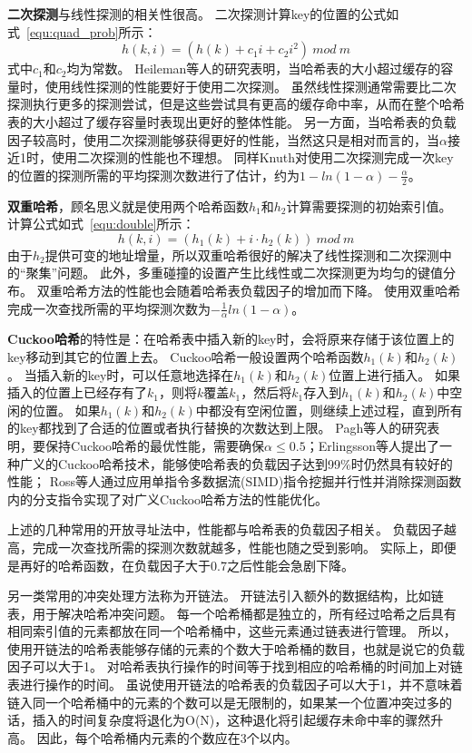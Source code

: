 \textbf{二次探测}与线性探测的相关性很高。
二次探测计算key的位置的公式如式~\ref{equ:quad_prob}所示：
\begin{equation}
h(k,i) = (h(k)+c_1 i+c_2i^2)~{mod}~m
\label{equ:quad_prob}
\end{equation}
式中$c_1$和$c_2$均为常数。
Heileman等人的研究表明，当哈希表的大小超过缓存的容量时，使用线性探测的性能要好于使用二次探测\cite{heileman2005caching}。
虽然线性探测通常需要比二次探测执行更多的探测尝试，但是这些尝试具有更高的缓存命中率，从而在整个哈希表的大小超过了缓存容量时表现出更好的整体性能。
另一方面，当哈希表的负载因子较高时，使用二次探测能够获得更好的性能，当然这只是相对而言的，当$\alpha$接近1时，使用二次探测的性能也不理想。
同样Knuth对使用二次探测完成一次key的位置的探测所需的平均探测次数进行了估计，约为$1-ln(1-\alpha)-\frac{\alpha}{2}$。

\textbf{双重哈希}，顾名思义就是使用两个哈希函数$h_1$和$h_2$计算需要探测的初始索引值。
计算公式如式~\ref{equ:double}所示：
\begin{equation}
h(k,i) = (h_1(k)+i\cdot h_2(k)) ~{mod}~m
\label{equ:double}
\end{equation}
由于$h_2$提供可变的地址增量，所以双重哈希很好的解决了线性探测和二次探测中的“聚集”问题。
此外，多重碰撞的设置产生比线性或二次探测更为均匀的键值分布。
双重哈希方法的性能也会随着哈希表负载因子的增加而下降。
使用双重哈希完成一次查找所需的平均探测次数为$-\frac{1}{\alpha}ln(1-\alpha)$。

\textbf{Cuckoo哈希}的特性是：在哈希表中插入新的key时，会将原来存储于该位置上的key移动到其它的位置上去。
Cuckoo哈希一般设置两个哈希函数$h_1(k)$和$h_2(k)$。
当插入新的key时，可以任意地选择在$h_1(k)$和$h_2(k)$位置上进行插入。
如果插入的位置上已经存有了$k_1$，则将$k$覆盖$k_1$，然后将$k_1$存入到$h_1(k)$和$h_2(k)$中空闲的位置。
如果$h_1(k)$和$h_2(k)$中都没有空闲位置，则继续上述过程，直到所有的key都找到了合适的位置或者执行替换的次数达到上限\cite{pagh2004cuckoo,erlingsson2006cool}。
Pagh等人的研究表明，要保持Cuckoo哈希的最优性能，需要确保$\alpha\leq 0.5$\cite{pagh2004cuckoo}；Erlingsson等人提出了一种广义的Cuckoo哈希技术\cite{erlingsson2006cool}，能够使哈希表的负载因子达到99\%时仍然具有较好的性能；
Ross等人通过应用单指令多数据流(SIMD)指令挖掘并行性并消除探测函数内的分支指令实现了对广义Cuckoo哈希方法的性能优化\cite{ross2007efficient}。

上述的几种常用的开放寻址法中，性能都与哈希表的负载因子相关。
负载因子越高，完成一次查找所需的探测次数就越多，性能也随之受到影响。
实际上，即便是再好的哈希函数，在负载因子大于0.7之后性能会急剧下降。

另一类常用的冲突处理方法称为开链法。
开链法引入额外的数据结构，比如链表，用于解决哈希冲突问题。
每一个哈希桶都是独立的，所有经过哈希之后具有相同索引值的元素都放在同一个哈希桶中，这些元素通过链表进行管理。
所以，使用开链法的哈希表能够存储的元素的个数大于哈希桶的数目，也就是说它的负载因子可以大于1。
对哈希表执行操作的时间等于找到相应的哈希桶的时间加上对链表进行操作的时间。
虽说使用开链法的哈希表的负载因子可以大于1，并不意味着链入同一个哈希桶中的元素的个数可以是无限制的，如果某一个位置冲突过多的话，插入的时间复杂度将退化为O(N)，这种退化将引起缓存未命中率的骤然升高\cite{black1998graph}。
因此，每个哈希桶内元素的个数应在3个以内。

